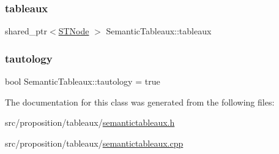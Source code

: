 \subsubsection{\texorpdfstring{tableaux}{tableaux}}
{\footnotesize\ttfamily shared\+\_\+ptr$<$\hyperlink{class_s_t_node}{S\+T\+Node} $>$ Semantic\+Tableaux\+::tableaux\hspace{0.3cm}{\ttfamily [private]}}

\mbox{\label{class_semantic_tableaux_a9fd70e5435a0fed98339fd3dad868e71}} 
\subsubsection{\texorpdfstring{tautology}{tautology}}
{\footnotesize\ttfamily bool Semantic\+Tableaux\+::tautology = true\hspace{0.3cm}{\ttfamily [private]}}



The documentation for this class was generated from the following files\+:\begin{DoxyCompactItemize}
\item 
src/proposition/tableaux/\hyperlink{semantictableaux_8h}{semantictableaux.\+h}\item 
src/proposition/tableaux/\hyperlink{semantictableaux_8cpp}{semantictableaux.\+cpp}\end{DoxyCompactItemize}

